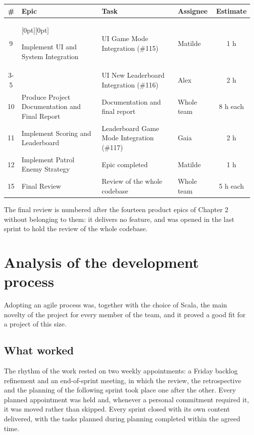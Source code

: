 \begin{center}
  \small
  \begin{tabular}{|c|p{3.5cm}|p{5.0cm}|p{2.3cm}|c|}
    \hline
    \textbf{\#} & \textbf{Epic} & \textbf{Task} & \textbf{Assignee} & \textbf{Estimate} \\
    \hline
    9 & \raisebox{0pt}[0pt][0pt]{\parbox[t]{3.5cm}{Implement UI and System Integration}} & UI Game Mode Integration (\#115) & Matilde & 1 h \\
    \cline{3-5}
      &  & UI New Leaderboard Integration (\#116) & Alex & 2 h \\
    \hline
    10 & Produce Project Documentation and Final Report & Documentation and final report & Whole team & 8 h each \\
    \hline
    11 & Implement Scoring and Leaderboard & Leaderboard Game Mode Integration (\#117) & Gaia & 2 h \\
    \hline
    12 & Implement Patrol Enemy Strategy & Epic completed & Matilde & 1 h \\
    \hline
    15 & Final Review & Review of the whole codebase & Whole team & 5 h each \\
    \hline
  \end{tabular}
\end{center}

The final review is numbered after the fourteen product epics of Chapter 2 without belonging to them: it delivers no
feature, and was opened in the last sprint to hold the review of the whole codebase.

\section{Analysis of the development process}

Adopting an agile process was, together with the choice of Scala, the main novelty of the project for every member of
the team, and it proved a good fit for a project of this size.

\subsection{What worked}

The rhythm of the work rested on two weekly appointments: a Friday backlog refinement and an end-of-sprint meeting,
in which the review, the retrospective and the planning of the following sprint took place one after the other. Every
planned appointment was held and, whenever a personal commitment required it, it was moved rather than skipped. Every
sprint closed with its own content delivered, with the tasks planned during planning completed within the agreed time.

